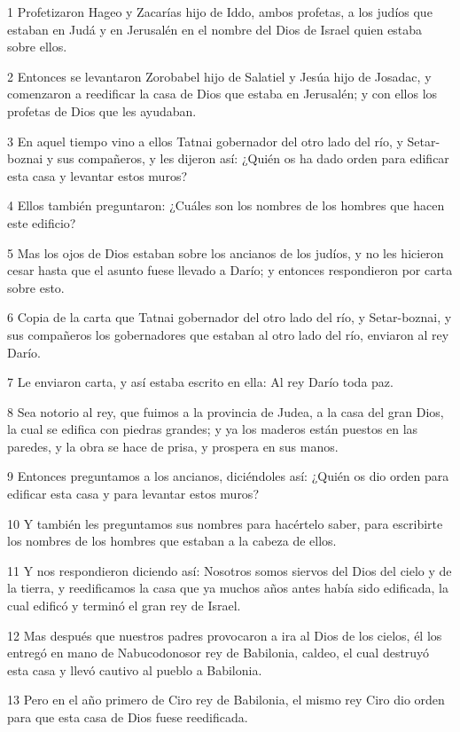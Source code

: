\par 1 Profetizaron Hageo y Zacarías hijo de Iddo, ambos profetas, a los judíos que estaban en Judá y en Jerusalén en el nombre del Dios de Israel quien estaba sobre ellos.
\par 2 Entonces se levantaron Zorobabel hijo de Salatiel y Jesúa hijo de Josadac, y comenzaron a reedificar la casa de Dios que estaba en Jerusalén; y con ellos los profetas de Dios que les ayudaban.
\par 3 En aquel tiempo vino a ellos Tatnai gobernador del otro lado del río, y Setar-boznai y sus compañeros, y les dijeron así: ¿Quién os ha dado orden para edificar esta casa y levantar estos muros?
\par 4 Ellos también preguntaron: ¿Cuáles son los nombres de los hombres que hacen este edificio?
\par 5 Mas los ojos de Dios estaban sobre los ancianos de los judíos, y no les hicieron cesar hasta que el asunto fuese llevado a Darío; y entonces respondieron por carta sobre esto.
\par 6 Copia de la carta que Tatnai gobernador del otro lado del río, y Setar-boznai, y sus compañeros los gobernadores que estaban al otro lado del río, enviaron al rey Darío.
\par 7 Le enviaron carta, y así estaba escrito en ella: Al rey Darío toda paz.
\par 8 Sea notorio al rey, que fuimos a la provincia de Judea, a la casa del gran Dios, la cual se edifica con piedras grandes; y ya los maderos están puestos en las paredes, y la obra se hace de prisa, y prospera en sus manos.
\par 9 Entonces preguntamos a los ancianos, diciéndoles así: ¿Quién os dio orden para edificar esta casa y para levantar estos muros?
\par 10 Y también les preguntamos sus nombres para hacértelo saber, para escribirte los nombres de los hombres que estaban a la cabeza de ellos.
\par 11 Y nos respondieron diciendo así: Nosotros somos siervos del Dios del cielo y de la tierra, y reedificamos la casa que ya muchos años antes había sido edificada, la cual edificó y terminó el gran rey de Israel.
\par 12 Mas después que nuestros padres provocaron a ira al Dios de los cielos, él los entregó en mano de Nabucodonosor rey de Babilonia, caldeo, el cual destruyó esta casa y llevó cautivo al pueblo a Babilonia. 
\par 13 Pero en el año primero de Ciro rey de Babilonia, el mismo rey Ciro dio orden para que esta casa de Dios fuese reedificada. 
